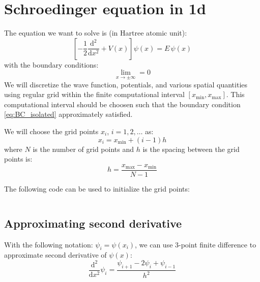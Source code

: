 \chapter{Schroedinger equation in 1d}

The equation we want to solve is (in Hartree atomic unit):
\begin{equation}
\left[ -\frac{1}{2}\frac{\mathrm{d}^2}{\mathrm{d}x^2} + V(x) \right] \psi(x) = E\, \psi(x)
\end{equation}
with the boundary conditions:
\begin{equation}
\lim_{x \rightarrow \pm \infty} = 0
\label{eq:BC_isolated}
\end{equation}
%
We will discretize the wave function, potentials, and various spatial quantities using
regular grid within the finite computational interval
$\left[x_{\mathrm{min}}, x_{\mathrm{max}}\right]$. This computational interval should be choosen
such that the boundary condition \ref{eq:BC_isolated} approximately satisfied.

We will choose the grid points $x_{i}$, $i = 1, 2, \ldots$ as:
\begin{equation}
x_{i} = x_{\mathrm{min}} + (i-1)h
\end{equation}
where $N$ is the number of grid points and $h$ is the spacing between the grid points
is:
\begin{equation}
h = \frac{ x_{\mathrm{max}} - x_{\mathrm{min}} }{N-1}
\end{equation}

The following code can be used to initialize the grid points:

\inputminted[breaklines]{julia}{codes/1d/init_FD1d_grid.jl}


\section{Approximating second derivative}

With the following notation: $\psi_{i} = \psi(x_{i})$, we can use 3-point
finite difference to approximate second derivative of $\psi(x)$:
\begin{equation}
\frac{\mathrm{d}^2}{\mathrm{d}x^2} \psi_{i} =
\frac{\psi_{i+1} - 2\psi_{i} + \psi_{i-1}}{h^2}
\end{equation}


